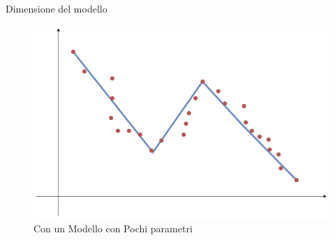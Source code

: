 \documentclass{beamer}
\begin{document}
\begin{frame}{Dimensione del modello}
    \begin{figure}
        \centering
        \includegraphics[width=.7\linewidth]{imgs/emergent/chartnn.badbad.png}
        \caption*{Con un Modello con Pochi parametri}
    \end{figure}
\end{frame}
\end{document}
